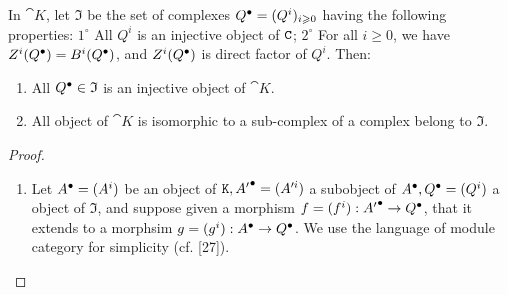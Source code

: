 \begin{lemma}[11.5.2.1]
\label{0.11.5.2.1}
In $\cat{K}$, let $\mathfrak{I}$ be the set of complexes ${Q}^{\bullet} = (Q^i)_{i\geqslant 0}$ having the following properties:
$1^\circ$ All $Q^i$ is an injective object of $\mathtt{C}$;
$2^\circ$ For all $i\geq 0$, we have $Z^i({Q}^{\bullet}) = B^i({Q}^{\bullet})$, and $Z^i({{Q}^{\bullet}})$ is direct factor of $Q^i$. Then:
\begin{enumerate}
  \item[(i)] All ${Q}^{\bullet}\in \mathfrak{I}$ is an injective object of $\cat{K}$.
  \item[(ii)] All object of $\cat{K}$ is isomorphic to a sub-complex of a complex belong to $\mathfrak{I}$.
\end{enumerate}
\end{lemma}
\begin{proof}
\begin{enumerate}
  \item[(i)] Let ${A}^{\bullet}=(A^i)$ be an object of $\mathtt{K}, {A'}^{\bullet} = (A'^i)$ a subobject of ${A}^{\bullet}, {Q}^{\bullet} = (Q^i)$
  a object of $\mathfrak{I}$, and suppose given a morphism $f = (f^i): {A'}^{\bullet}\rightarrow {Q}^{\bullet}$, that it extends 
  to a morphsim $g = (g^i): {A}^{\bullet}\rightarrow {Q}^{\bullet}$. We use the language of module category for simplicity (cf. [27]).


\end{enumerate}
\end{proof}
